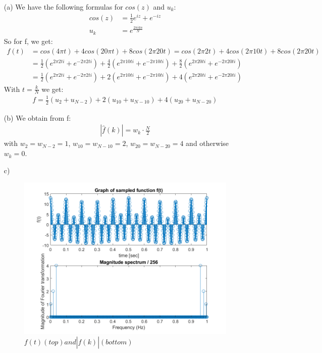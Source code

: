 \documentclass[12pt]{article}
\begin{document}
\begin{itemize}
    \item[(a)] We have the following formulas for $cos(z)$ and $u_k$:
    \begin{align*}
      cos(z) &= \frac{1}{2} e^{iz} + e^{-iz} \\
      u_k &= e^{\frac{2 \pi i k n}{N}}
    \end{align*}
    So for f, we get:
    \begin{align*}
      f(t) &= cos(4\pi t) + 4 cos(20\pi t) + 8 cos(2\pi 20 t) = cos(2\pi 2 t) + 4 cos(2\pi 10 t) + 8 cos(2\pi 20 t)\\
      &= \frac{1}{2} \left( e^{2 \pi 2 t i} + e^{-2 \pi 2 t i} \right) + \frac{4}{2} \left( e^{2 \pi 10 t i} + e^{-2 \pi 10 t i} \right) + \frac{8}{2} \left( e^{2 \pi 20 t i} + e^{-2 \pi 20 t i} \right)\\
      &= \frac{1}{2} \left( e^{2 \pi 2 t i} + e^{-2 \pi 2 t i} \right) + 2 \left( e^{2 \pi 10 t i} + e^{-2 \pi 10 t i} \right) + 4 \left( e^{2 \pi 20 t i} + e^{-2 \pi 20 t i} \right)
    \end{align*}
    With $t=\frac{k}{N}$ we get:
    \begin{align*}
      f = \frac{1}{2} \left(u_2 + u_{N-2} \right) + 2 \left( u_{10} + u_{N-10} \right) + 4 \left(u_{20} + u_{N-20} \right)
    \end{align*}
      \item[(b)] We obtain from f:
      \begin{align*}
        |\hat f(k)|=w_k \cdot \frac{N}{2}
      \end{align*}
      with $w_2=w_{N-2}=1$, $w_{10}=w_{N-10}=2$, $w_{20}=w_{N-20}=4$ and otherwise $w_k=0$.
      \item[c)]
      \begin{figure}[h]
          \centering
          \includegraphics[width=1.1\textwidth]{Sheet3Exercise1.png}
          \caption{$f(t) (top) and |\hat f(k)| (bottom)$}
          \label{abb}
      \end{figure}
\end{itemize}
\end{document}

